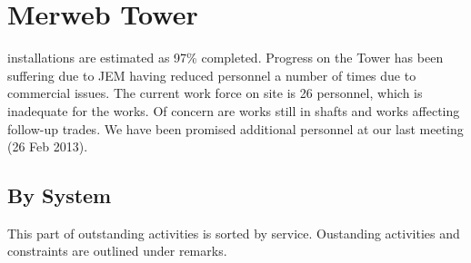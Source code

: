 \chapter{Merweb Tower}

 installations are estimated as 97\% completed. Progress on the Tower has been suffering due to JEM having reduced personnel a number of times due to commercial issues. The current work force on site is 26 personnel, which is inadequate for the works. Of concern are works still in shafts and works affecting follow-up trades. We have been promised additional personnel at our last meeting (26 Feb 2013).


%




\section{By System}
This part of outstanding activities is sorted by service. Oustanding activities and constraints are outlined under remarks. 
\bigskip




